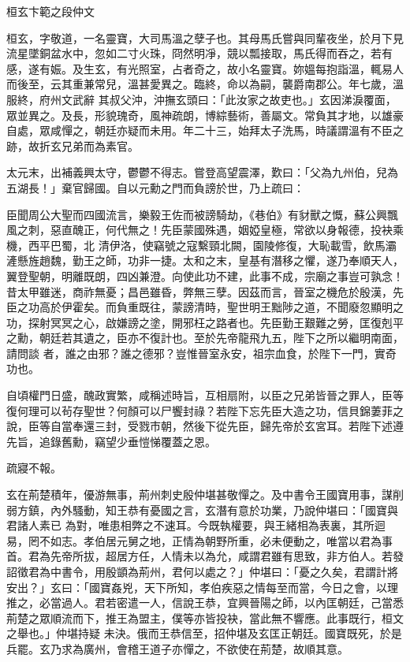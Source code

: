 
\begin{pinyinscope}

 桓玄卞範之段仲文



 桓玄，字敬道，一名靈寶，大司馬溫之孽子也。其母馬氏嘗與同輩夜坐，於月下見流星墜銅盆水中，忽如二寸火珠，冏然明凈，競以瓢接取，馬氏得而吞之，若有感，遂有娠。及生玄，有光照室，占者奇之，故小名靈寶。妳媼每抱詣溫，輒易人而後至，云其重兼常兒，溫甚愛異之。臨終，命以為嗣，襲爵南郡公。年七歲，溫服終，府州文武辭
 其叔父沖，沖撫玄頭曰：「此汝家之故吏也。」玄因涕淚覆面，眾並異之。及長，形貌瑰奇，風神疏朗，博綜藝術，善屬文。常負其才地，以雄豪自處，眾咸憚之，朝廷亦疑而未用。年二十三，始拜太子洗馬，時議謂溫有不臣之跡，故折玄兄弟而為素官。



 太元末，出補義興太守，鬱鬱不得志。嘗登高望震澤，歎曰：「父為九州伯，兒為五湖長！」棄官歸國。自以元勳之門而負謗於世，乃上疏曰：



 臣聞周公大聖而四國流言，樂毅王佐而被謗騎劫，《巷伯》有豺獸之慨，蘇公興飄風之刺，惡直醜正，何代無之！先臣蒙國殊遇，姻婭皇極，常欲以身報德，投袂乘機，西平巴蜀，北
 清伊洛，使竊號之寇繫頸北闕，園陵修復，大恥載雪，飲馬灞滻懸旌趙魏，勤王之師，功非一捷。太和之末，皇基有潛移之懼，遂乃奉順天人，翼登聖朝，明離既朗，四凶兼澄。向使此功不建，此事不成，宗廟之事豈可孰念！昔太甲雖迷，商祚無憂；昌邑雖昏，弊無三孽。因茲而言，晉室之機危於殷漢，先臣之功高於伊霍矣。而負重既往，蒙謗清時，聖世明王黜陟之道，不聞廢忽顯明之功，探射冥冥之心，啟嫌謗之塗，開邪枉之路者也。先臣勤王艱難之勞，匡復剋平之勳，朝廷若其遺之，臣亦不復計也。至於先帝龍飛九五，陛下之所以繼明南面，請問談
 者，誰之由邪？誰之德邪？豈惟晉室永安，祖宗血食，於陛下一門，實奇功也。



 自頃權門日盛，醜政實繁，咸稱述時旨，互相扇附，以臣之兄弟皆晉之罪人，臣等復何理可以茍存聖世？何顏可以尸饗封祿？若陛下忘先臣大造之功，信貝錦萋菲之說，臣等自當奉還三封，受戮市朝，然後下從先臣，歸先帝於玄宮耳。若陛下述遵先旨，追錄舊勳，竊望少垂愷悌覆蓋之恩。



 疏寢不報。



 玄在荊楚積年，優游無事，荊州刺史殷仲堪甚敬憚之。及中書令王國寶用事，謀削弱方鎮，內外騷動，知王恭有憂國之言，玄潛有意於功業，乃說仲堪曰：「國寶與君諸人素已
 為對，唯患相弊之不速耳。今既執權要，與王緒相為表裏，其所迴易，罔不如志。孝伯居元舅之地，正情為朝野所重，必未便動之，唯當以君為事首。君為先帝所拔，超居方任，人情未以為允，咸謂君雖有思致，非方伯人。若發詔徵君為中書令，用殷顗為荊州，君何以處之？」仲堪曰：「憂之久矣，君謂計將安出？」玄曰：「國寶姦兇，天下所知，孝伯疾惡之情每至而當，今日之會，以理推之，必當過人。君若密遣一人，信說王恭，宜興晉陽之師，以內匡朝廷，己當悉荊楚之眾順流而下，推王為盟主，僕等亦皆投袂，當此無不響應。此事既行，桓文之舉也。」仲堪持疑
 未決。俄而王恭信至，招仲堪及玄匡正朝廷。國寶既死，於是兵罷。玄乃求為廣州，會稽王道子亦憚之，不欲使在荊楚，故順其意。




\end{pinyinscope}
